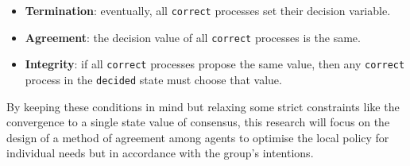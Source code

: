 \documentclass[a4paper,singleside,12pt]{report} %
\begin{document}
\begin{itemize}
\item \textbf{Termination}: eventually, all \texttt{correct} processes set their decision variable.
\item \textbf{Agreement}: the decision value of all \texttt{correct} processes is the same.
\item \textbf{Integrity}: if all \texttt{correct} processes propose the same value, then any \texttt{correct} process in the \texttt{decided} state must choose that value.
\end{itemize}

By keeping these conditions in mind but relaxing some strict constraints like the convergence to a single state value of consensus, this research will focus on the design of a method of agreement among agents to optimise the local policy for individual needs but in accordance with the group's intentions.

\end{document}
